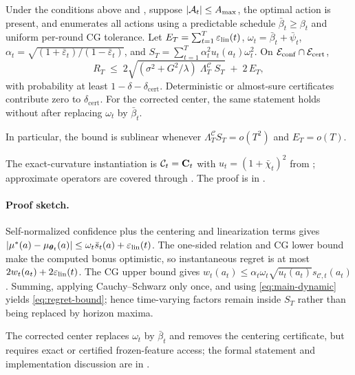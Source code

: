 \documentclass[twoside]{article}
\newcommand{\Calg}{\mathcal{C}}                 %
\newcommand{\Lamalg}{\Lambda^{\Calg}}           %
\begin{document}
\begin{theorem}\label{thm:regret}
Under the conditions above and ,
suppose $|\mathcal{A}_t|\le A_{\max}$, the optimal action is present, and
 enumerates all actions using a predictable schedule
$\bar\beta_t\ge\beta_t$ and uniform per-round CG tolerance.  Let
$E_T=\sum_{t=1}^T\varepsilon_{\mathrm{lin}}(t)$, $\omega_t=\bar\beta_t+\bar\psi_t$,
$\alpha_t=\sqrt{(1+\bar\varepsilon_t)/(1-\bar\varepsilon_t)}$, and
$S_T=\sum_{t=1}^T\alpha_t^2u_t(a_t)\omega_t^2$.  On
$\mathcal{E}_{\mathrm{conf}}\cap\mathcal{E}_{\mathrm{cert}}$,
\begin{equation}\label{eq:regret-bound}
  R_T
  \;\le\;
  2\sqrt{(\sigma^2 + G^2/\lambda)\;\Lamalg_T\;S_T}
  \;+\; 2\,E_T,
\end{equation}
with probability at least $1-\delta-\delta_{\mathrm{cert}}$.  Deterministic or
almost-sure certificates contribute zero to $\delta_{\mathrm{cert}}$.  For the
corrected center, the same statement holds without  after
replacing $\omega_t$ by $\bar\beta_t$.
\end{theorem}

In particular, the bound is sublinear whenever
$\Lamalg_T S_T=o(T^2)$ and $E_T=o(T)$.

The exact-curvature instantiation is $\Calg_t=\bC_t$ with
$u_t=(1+\bar\chi_t)^2$ from ; approximate operators are
covered through .  The proof is in
.

\paragraph{Proof sketch.}
Self-normalized confidence plus the centering and linearization terms gives
$|\mu^*(a)-\mu_{\boldsymbol{\theta}_t}(a)|\le\omega_t\bar s_t(a)+\varepsilon_{\mathrm{lin}}(t)$.
The one-sided relation and CG lower bound make the computed bonus optimistic,
so instantaneous regret is at most $2w_t(a_t)+2\varepsilon_{\mathrm{lin}}(t)$.  The CG upper
bound gives $w_t(a_t)\le\alpha_t\omega_t\sqrt{u_t(a_t)}s_{\Calg,t}(a_t)$.
Summing, applying Cauchy--Schwarz only once, and using \eqref{eq:main-dynamic}
yields \eqref{eq:regret-bound}; hence time-varying factors remain inside $S_T$
rather than being replaced by horizon maxima.

The corrected center replaces $\omega_t$ by $\bar\beta_t$ and removes the
centering certificate, but requires exact or certified frozen-feature access;
the formal statement and implementation discussion are in
.
\end{document}
